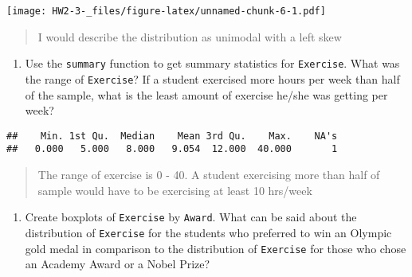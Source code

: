\documentclass[]{article}
\newenvironment{Shaded}{\begin{snugshade}}{\end{snugshade}}
\newcommand{\DataTypeTok}[1]{\textcolor[rgb]{0.13,0.29,0.53}{#1}}
\newcommand{\DecValTok}[1]{\textcolor[rgb]{0.00,0.00,0.81}{#1}}
\newcommand{\KeywordTok}[1]{\textcolor[rgb]{0.13,0.29,0.53}{\textbf{#1}}}
\newcommand{\NormalTok}[1]{#1}
\newcommand{\OperatorTok}[1]{\textcolor[rgb]{0.81,0.36,0.00}{\textbf{#1}}}
\newcommand{\StringTok}[1]{\textcolor[rgb]{0.31,0.60,0.02}{#1}}
\providecommand{\tightlist}{%
  \setlength{\itemsep}{0pt}\setlength{\parskip}{0pt}}
\begin{document}
\begin{Shaded}
\end{Shaded}

\texttt{[image: HW2-3-\_files/figure-latex/unnamed-chunk-6-1.pdf]}

\begin{quote}
I would describe the distribution as unimodal with a left skew
\end{quote}

\begin{enumerate}
\def\labelenumi{\alph{enumi})}
\setcounter{enumi}{1}
\tightlist
\item
  Use the \texttt{summary} function to get summary statistics for
  \texttt{Exercise}. What was the range of \texttt{Exercise}? If a
  student exercised more hours per week than half of the sample, what is
  the least amount of exercise he/she was getting per week?
\end{enumerate}

\begin{Shaded}
\end{Shaded}

\begin{verbatim}
##    Min. 1st Qu.  Median    Mean 3rd Qu.    Max.    NA's 
##   0.000   5.000   8.000   9.054  12.000  40.000       1
\end{verbatim}

\begin{quote}
The range of exercise is 0 - 40. A student exercising more than half of
sample would have to be exercising at least 10 hrs/week
\end{quote}

\begin{enumerate}
\def\labelenumi{\alph{enumi})}
\setcounter{enumi}{2}
\tightlist
\item
  Create boxplots of \texttt{Exercise} by \texttt{Award}. What can be
  said about the distribution of \texttt{Exercise} for the students who
  preferred to win an Olympic gold medal in comparison to the
  distribution of \texttt{Exercise} for those who chose an Academy Award
  or a Nobel Prize?
\end{enumerate}
\end{document}
